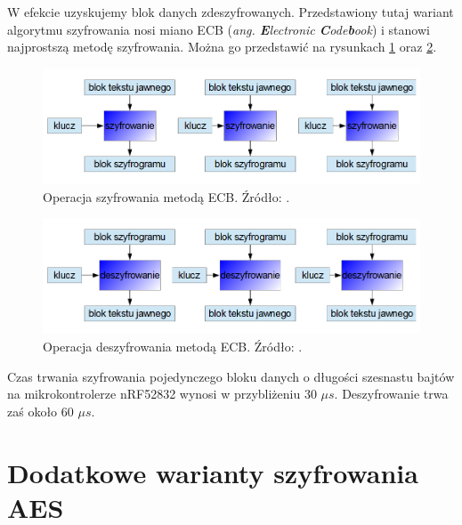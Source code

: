 W efekcie uzyskujemy blok danych zdeszyfrowanych.
Przedstawiony tutaj wariant algorytmu szyfrowania nosi miano ECB (\textit{ang. \textbf{E}lectronic \textbf{C}ode\textbf{b}ook}) i stanowi najprostszą metodę szyfrowania. Można go przedstawić na rysunkach \ref{fig:image_ecb_encrypt} oraz \ref{fig:image_ecb_decrypt}.

	\begin{figure}[h]
		\centering
		\includegraphics[width=15cm]{img/com_security/ECB_szyfrowanie.png}
		\caption{Operacja szyfrowania metodą ECB. Źródło: \cite{aes_cryptoit}.}
		\label{fig:image_ecb_encrypt}
	\end{figure}
	
	\begin{figure}[h]
		\centering
		\includegraphics[width=15cm]{img/com_security/ECB_deszyfrowanie.png}
		\caption{Operacja deszyfrowania metodą ECB. Źródło: \cite{aes_cryptoit}.}
		\label{fig:image_ecb_decrypt}
	\end{figure}
	
Czas trwania szyfrowania pojedynczego bloku danych o długości szesnastu bajtów na mikrokontrolerze nRF52832 wynosi w przybliżeniu 30 $\mu s$. Deszyfrowanie trwa zaś około 60 $\mu s$.


\section{Dodatkowe warianty szyfrowania AES}


